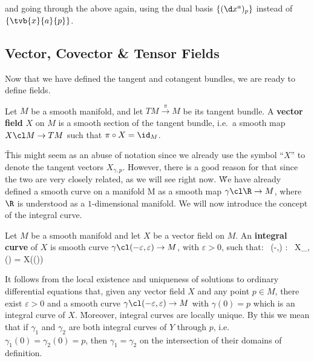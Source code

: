 and going through the above again, using the dual basis $\{(\d x^a)_p\}$ instead of $\{\tvb{x}{a}{p}\}$.

\subsection{Vector, Covector \& Tensor Fields}

Now that we have defined the tangent and cotangent bundles, we are ready to define fields.

Let $M$ be a smooth manifold, and let $TM\xrightarrow{\,\pi\,}M$ be its tangent bundle. A \textbf{vector field} $X$ on
$M$ is a smooth section of the tangent bundle, i.e.\ a smooth map $X \cl M \to TM$ such that $\pi \circ X = \id_M$.
\bse
{}
\ese
\ed

\v

This might seem as an abuse of notation since we already use the symbol ``$X$'' to denote the tangent vectors
$X_{\gamma, p}$. However, there is a good reason for that since the two are very closely related, as we will see
right now. \v

We have already defined a smooth curve on a manifold M as a smooth map $\gamma\cl \R \to M$, where $\R$ is understood
as a $1$-dimensional manifold. We will now introduce the concept of the integral curve.

Let $M$ be a smooth manifold and let $X$ be a vector field on $M$. An \textbf{integral curve} of $X$ is smooth curve
$\gamma\cl(-\varepsilon,\varepsilon)\to M$, with $\varepsilon > 0$, such that:
\bse
\forall \, \lambda \in (-\varepsilon,\varepsilon) : \ X_{\gamma,\gamma(\lambda)} = X(\gamma(\lambda))
\ese
\ed

It follows from the local existence and uniqueness of solutions to ordinary differential equations that, given any
vector field $X$ and any point $p\in M$, there exist $\varepsilon >0$ and a smooth curve $\gamma\cl (-\varepsilon,
\varepsilon) \to M$ with $\gamma(0)=p$ which is an integral curve of $X$. \v

Moreover, integral curves are locally unique. By this we mean that if $\gamma_1$ and $\gamma_2$ are both integral
curves of $Y$ through $p$, i.e.\ $\gamma_1(0)=\gamma_2(0) = p$, then $\gamma_1=\gamma_2$ on the intersection of their
domains of definition.

